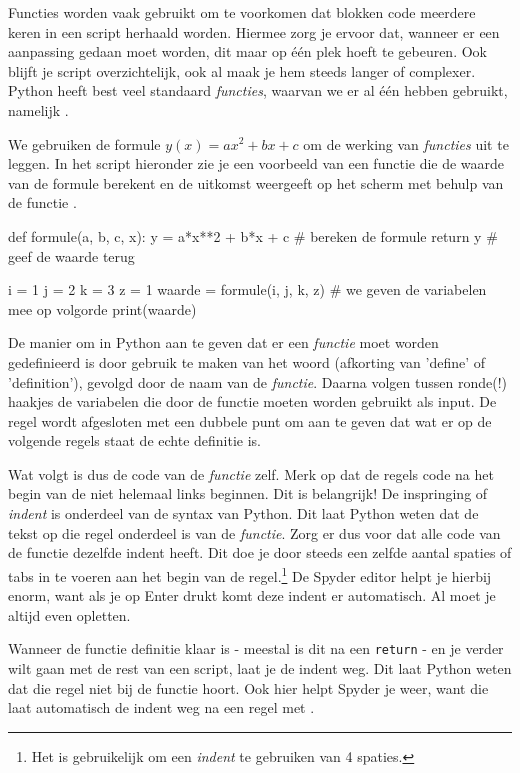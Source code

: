 \documentclass[a4paper,11pt, fleqn]{article}
\begin{document}
Functies worden vaak gebruikt om te voorkomen dat blokken code meerdere keren in een script herhaald worden. 
Hiermee zorg je ervoor dat, wanneer er een aanpassing gedaan moet worden, dit maar op \'e\'en plek hoeft te gebeuren. 
Ook blijft je script overzichtelijk, ook al maak je hem steeds langer of complexer. 
Python heeft best veel standaard \textit{functies}, waarvan we er al \'e\'en hebben gebruikt, namelijk . 

We gebruiken de formule $y(x) = a x^2+b x + c$ om de werking van \textit{functies} uit te leggen. In het script hieronder zie je een voorbeeld van een functie die de waarde van de formule berekent en de uitkomst weergeeft op het scherm met behulp van de functie .

\begin{python}
	def formule(a, b, c, x):
	    y = a*x**2 + b*x + c	# bereken de formule
	    return y				# geef de waarde terug
	    
	i = 1
	j = 2
	k = 3
	z = 1
	waarde = formule(i, j, k, z)    # we geven de variabelen mee op volgorde
	print(waarde)
\end{python} 

De manier om in Python aan te geven dat er een \textit{functie} moet worden gedefinieerd is door gebruik te maken van het woord  (afkorting van 'define' of 'definition'), gevolgd door de naam van de \textit{functie}. Daarna volgen tussen ronde(!) haakjes de variabelen die door de functie moeten worden gebruikt als input. De regel wordt afgesloten met een dubbele punt om aan te geven dat wat er op de volgende regels staat de echte definitie is. 

Wat volgt is dus de code van de \textit{functie} zelf. Merk op dat de regels code na het begin van de  niet helemaal links beginnen. Dit is belangrijk! De inspringing of \textit{indent} is onderdeel van de syntax van Python. Dit laat Python weten dat de tekst op die regel onderdeel is van de \textit{functie}. Zorg er dus voor dat alle code van de functie dezelfde indent heeft. Dit doe je door steeds een zelfde aantal spaties of tabs in te voeren aan het begin van de regel.\footnote{Het is gebruikelijk om een \textit{indent} te gebruiken van 4 spaties.} De Spyder editor helpt je hierbij enorm, want als je op Enter drukt komt deze indent er automatisch. Al moet je altijd even opletten.

Wanneer de functie definitie klaar is - meestal is dit na een \verb,return, - en je verder wilt gaan met de rest van een script, laat je de indent weg. Dit laat Python weten dat die regel niet bij de functie hoort. Ook hier helpt Spyder je weer, want die laat automatisch de indent weg na een regel met .
\end{document}
